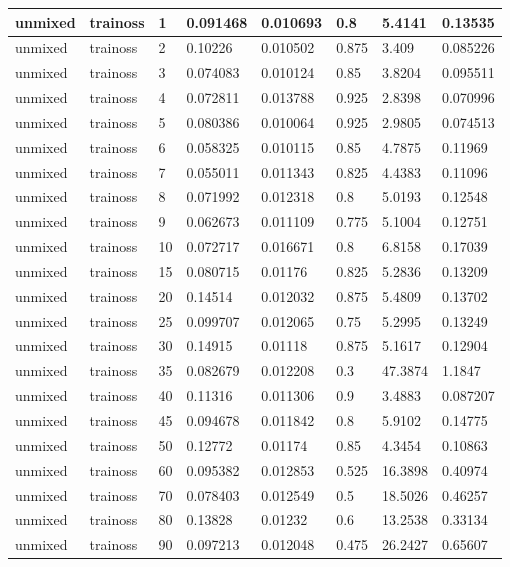 \begin{longtable}{llllllll}
unmixed & trainoss & 1 & 0.091468 & 0.010693 & 0.8 & 5.4141 & 0.13535 \\ \hline 
unmixed & trainoss & 2 & 0.10226 & 0.010502 & 0.875 & 3.409 & 0.085226 \\ \hline 
unmixed & trainoss & 3 & 0.074083 & 0.010124 & 0.85 & 3.8204 & 0.095511 \\ \hline 
unmixed & trainoss & 4 & 0.072811 & 0.013788 & 0.925 & 2.8398 & 0.070996 \\ \hline 
unmixed & trainoss & 5 & 0.080386 & 0.010064 & 0.925 & 2.9805 & 0.074513 \\ \hline 
unmixed & trainoss & 6 & 0.058325 & 0.010115 & 0.85 & 4.7875 & 0.11969 \\ \hline 
unmixed & trainoss & 7 & 0.055011 & 0.011343 & 0.825 & 4.4383 & 0.11096 \\ \hline 
unmixed & trainoss & 8 & 0.071992 & 0.012318 & 0.8 & 5.0193 & 0.12548 \\ \hline 
unmixed & trainoss & 9 & 0.062673 & 0.011109 & 0.775 & 5.1004 & 0.12751 \\ \hline 
unmixed & trainoss & 10 & 0.072717 & 0.016671 & 0.8 & 6.8158 & 0.17039 \\ \hline 
unmixed & trainoss & 15 & 0.080715 & 0.01176 & 0.825 & 5.2836 & 0.13209 \\ \hline 
unmixed & trainoss & 20 & 0.14514 & 0.012032 & 0.875 & 5.4809 & 0.13702 \\ \hline 
unmixed & trainoss & 25 & 0.099707 & 0.012065 & 0.75 & 5.2995 & 0.13249 \\ \hline 
unmixed & trainoss & 30 & 0.14915 & 0.01118 & 0.875 & 5.1617 & 0.12904 \\ \hline 
unmixed & trainoss & 35 & 0.082679 & 0.012208 & 0.3 & 47.3874 & 1.1847 \\ \hline 
unmixed & trainoss & 40 & 0.11316 & 0.011306 & 0.9 & 3.4883 & 0.087207 \\ \hline 
unmixed & trainoss & 45 & 0.094678 & 0.011842 & 0.8 & 5.9102 & 0.14775 \\ \hline 
unmixed & trainoss & 50 & 0.12772 & 0.01174 & 0.85 & 4.3454 & 0.10863 \\ \hline 
unmixed & trainoss & 60 & 0.095382 & 0.012853 & 0.525 & 16.3898 & 0.40974 \\ \hline 
unmixed & trainoss & 70 & 0.078403 & 0.012549 & 0.5 & 18.5026 & 0.46257 \\ \hline 
unmixed & trainoss & 80 & 0.13828 & 0.01232 & 0.6 & 13.2538 & 0.33134 \\ \hline 
unmixed & trainoss & 90 & 0.097213 & 0.012048 & 0.475 & 26.2427 & 0.65607 \\ \hline 

\end{longtable}
